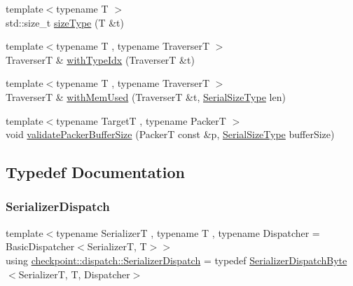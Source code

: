 \begin{DoxyCompactItemize}
\item 
{\footnotesize template$<$typename T $>$ }\\std\+::size\+\_\+t \hyperlink{namespacecheckpoint_1_1dispatch_a803d1b0d7a7611cb5440688dd12a3ccd}{size\+Type} (T \&t)
\item 
{\footnotesize template$<$typename T , typename TraverserT $>$ }\\TraverserT \& \hyperlink{namespacecheckpoint_1_1dispatch_a23852566cd2c0568dac667166adc60b5}{with\+Type\+Idx} (TraverserT \&t)
\item 
{\footnotesize template$<$typename T , typename TraverserT $>$ }\\TraverserT \& \hyperlink{namespacecheckpoint_1_1dispatch_a334d786918f1779e827025ad338bbac9}{with\+Mem\+Used} (TraverserT \&t, \hyperlink{namespacecheckpoint_a083f6674da3f94c2901b18c6d238217c}{Serial\+Size\+Type} len)
\item 
{\footnotesize template$<$typename TargetT , typename PackerT $>$ }\\void \hyperlink{namespacecheckpoint_1_1dispatch_a45cd06e9cac244ce0f5cc265ef52fd4e}{validate\+Packer\+Buffer\+Size} (PackerT const \&p, \hyperlink{namespacecheckpoint_a083f6674da3f94c2901b18c6d238217c}{Serial\+Size\+Type} buffer\+Size)
\end{DoxyCompactItemize}


\subsection{Typedef Documentation}
\mbox{\label{namespacecheckpoint_1_1dispatch_ae3a710db2b07fd1322ab9e6b3bbf45b4}} 
\subsubsection{\texorpdfstring{Serializer\+Dispatch}{SerializerDispatch}}
{\footnotesize\ttfamily template$<$typename SerializerT , typename T , typename Dispatcher  = Basic\+Dispatcher$<$\+Serializer\+T, T$>$$>$ \\
using \hyperlink{namespacecheckpoint_1_1dispatch_ae3a710db2b07fd1322ab9e6b3bbf45b4}{checkpoint\+::dispatch\+::\+Serializer\+Dispatch} = typedef \hyperlink{structcheckpoint_1_1dispatch_1_1_serializer_dispatch_byte}{Serializer\+Dispatch\+Byte}$<$SerializerT, T, Dispatcher$>$}



